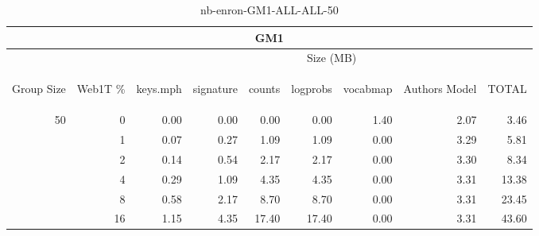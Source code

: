 \begin{center}
\begin{table}[htbp]
\begin{tabular}{ | r | r | r | r | r | r | r | r | r |}
\hline
\multicolumn{9}{|c|}{GM1}\\
\hline
 & & \multicolumn{7}{|c|}{Size (MB)}\\ \cline{3-9}
\begin{sideways}Group Size\end{sideways} & \begin{sideways}Web1T \% \end{sideways} & \begin{sideways}keys.mph\end{sideways} & \begin{sideways}signature\end{sideways} & \begin{sideways}counts\end{sideways} & \begin{sideways}logprobs\end{sideways} & \begin{sideways}vocabmap\end{sideways} & \begin{sideways}Authors Model \end{sideways} & \begin{sideways}TOTAL\end{sideways}\\
\hline
\multirow{5}{*}{50}
 & 0 & 0.00 & 0.00 & 0.00 & 0.00 & 1.40 & 2.07 & 3.46\\ \cline{2-9}
 & 1 & 0.07 & 0.27 & 1.09 & 1.09 & 0.00 & 3.29 & 5.81\\ \cline{2-9}
 & 2 & 0.14 & 0.54 & 2.17 & 2.17 & 0.00 & 3.30 & 8.34\\ \cline{2-9}
 & 4 & 0.29 & 1.09 & 4.35 & 4.35 & 0.00 & 3.31 & 13.38\\ \cline{2-9}
 & 8 & 0.58 & 2.17 & 8.70 & 8.70 & 0.00 & 3.31 & 23.45\\ \cline{2-9}
 & 16 & 1.15 & 4.35 & 17.40 & 17.40 & 0.00 & 3.31 & 43.60\\ \cline{2-9}
\hline
\end{tabular}
\caption{nb-enron-GM1-ALL-ALL-50}
\label{table:nb-enron-GM1-ALL-ALL-50}
\end{table}
\end{center}

